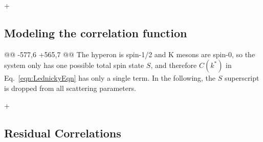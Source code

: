 +%
 \subsection{Modeling the correlation function}
 \label{sec:ModelingCF}
 
@@ -577,6 +565,7 @@
 The \Lam hyperon is spin-1/2 and K mesons are spin-0, so the \LamK system only has one possible total spin state $S$, and therefore $C(k^{*})$ in Eq.\ \ref{eqn:LednickyEqn} has only a single term.
 In the following, the $S$ superscript is dropped from all scattering parameters.
 
+%
 \subsection{Residual Correlations}
 \label{ResidualCorrelations}
 
